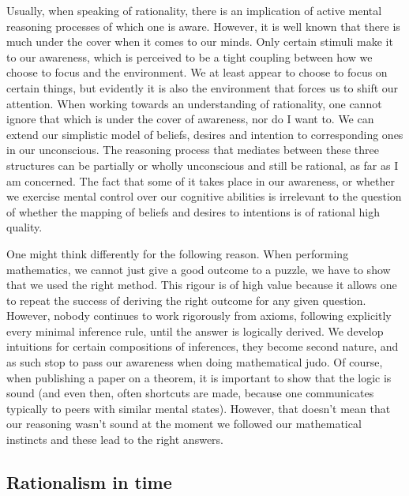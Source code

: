 Usually, when speaking of rationality, there is an implication of active mental reasoning processes of which one is aware. However, it is well known that there is much under the cover when it comes to our minds. Only certain stimuli make it to our awareness, which is perceived to be a tight coupling between how we choose to focus and the environment. We at least appear to choose to focus on certain things, but evidently it is also the environment that forces us to shift our attention. When working towards an understanding of rationality, one cannot ignore that which is under the cover of awareness, nor do I want to. We can extend our simplistic model of beliefs, desires and intention to corresponding ones in our unconscious. The reasoning process that mediates between these three structures can be partially or wholly unconscious and still be rational, as far as I am concerned. The fact that some of it takes place in our awareness, or whether we exercise mental control over our cognitive abilities is irrelevant to the question of whether the mapping of beliefs and desires to intentions is of rational high quality.

One might think differently for the following reason. When performing mathematics, we cannot just give a good outcome to a puzzle, we have to show that we used the right method. This rigour is of high value because it allows one to repeat the success of deriving the right outcome for any given question. However, nobody continues to work rigorously from axioms, following explicitly every minimal inference rule, until the answer is logically derived. We develop intuitions for certain compositions of inferences, they become second nature, and as such stop to pass our awareness when doing mathematical judo. Of course, when publishing a paper on a theorem, it is important to show that the logic is sound (and even then, often shortcuts are made, because one communicates typically to peers with similar mental states). However, that doesn't mean that our reasoning wasn't sound at the moment we followed our mathematical instincts and these lead to the right answers.

\subsection{Rationalism in time}

